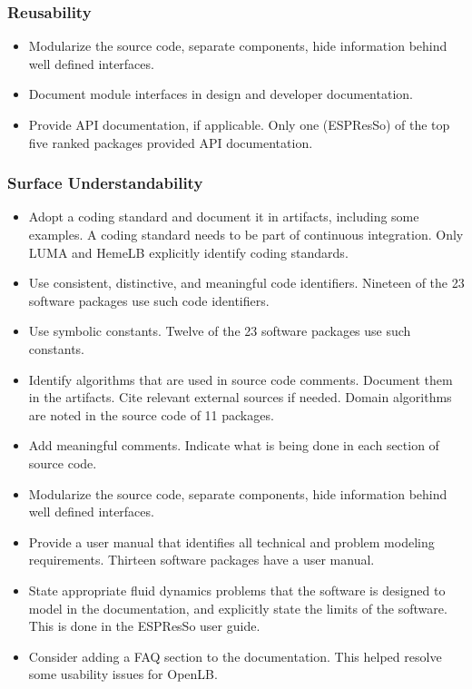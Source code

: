 \documentclass[12pt, notitlepage]{article}
\begin{document}
\subsubsection{Reusability}

\begin{itemize}
	\item Modularize the source code, separate components, hide information behind well defined interfaces.
	\item Document module interfaces in design and developer documentation. 
	\item Provide API documentation, if applicable. Only one (ESPResSo) of the top five ranked packages provided API documentation.
\end{itemize}

\subsubsection{Surface Understandability}

\begin{itemize}
	\item Adopt a coding standard and document it in artifacts, including some examples. A coding standard needs to be part of continuous integration. Only
	LUMA and HemeLB explicitly identify coding standards. 
	\item Use consistent, distinctive, and meaningful code identifiers. Nineteen of the 23 software packages use such code identifiers.
	\item Use symbolic constants. Twelve of the 23 software packages use such constants.
	\item Identify algorithms that are used in source code comments. Document them in the artifacts. Cite relevant external sources if needed. Domain algorithms are noted in the source code of 11 packages.
	\item Add meaningful comments. Indicate what is being done in each section of source code.
	\item Modularize the source code, separate components, hide information behind well defined interfaces.
	\item Provide a user manual that identifies all technical and problem modeling requirements. Thirteen software packages have a user manual.
	\item State appropriate fluid dynamics problems that the software is designed to model in the documentation, and explicitly state the limits of the software. This is done in the ESPResSo user guide. 
	\item Consider adding a FAQ section to the documentation. This helped resolve some usability issues for OpenLB.
\end{itemize}
\end{document}
